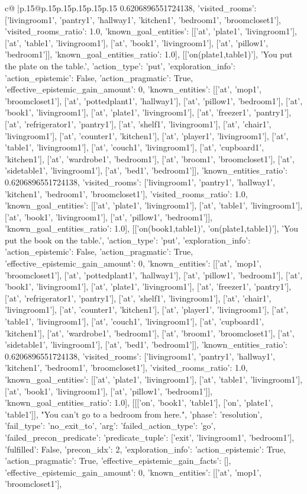 \documentclass{article}
\begin{document}
{\begin{supertabular}{c@{$\;$}|p{.15\linewidth}@{}p{.15\linewidth}p{.15\linewidth}p{.15\linewidth}p{.15\linewidth}p{.15\linewidth}}
{{{0.6206896551724138, 'visited_rooms': ['livingroom1', 'pantry1', 'hallway1', 'kitchen1', 'bedroom1', 'broomcloset1'], 'visited_rooms_ratio': 1.0, 'known_goal_entities': [['at', 'plate1', 'livingroom1'], ['at', 'table1', 'livingroom1'], ['at', 'book1', 'livingroom1'], ['at', 'pillow1', 'bedroom1']], 'known_goal_entities_ratio': 1.0}}], [['on(plate1,table1)'], 'You put the plate on the table.', {'action_type': 'put', 'exploration_info': {'action_epistemic': False, 'action_pragmatic': True, 'effective_epistemic_gain_amount': 0, 'known_entities': [['at', 'mop1', 'broomcloset1'], ['at', 'pottedplant1', 'hallway1'], ['at', 'pillow1', 'bedroom1'], ['at', 'book1', 'livingroom1'], ['at', 'plate1', 'livingroom1'], ['at', 'freezer1', 'pantry1'], ['at', 'refrigerator1', 'pantry1'], ['at', 'shelf1', 'livingroom1'], ['at', 'chair1', 'livingroom1'], ['at', 'counter1', 'kitchen1'], ['at', 'player1', 'livingroom1'], ['at', 'table1', 'livingroom1'], ['at', 'couch1', 'livingroom1'], ['at', 'cupboard1', 'kitchen1'], ['at', 'wardrobe1', 'bedroom1'], ['at', 'broom1', 'broomcloset1'], ['at', 'sidetable1', 'livingroom1'], ['at', 'bed1', 'bedroom1']], 'known_entities_ratio': 0.6206896551724138, 'visited_rooms': ['livingroom1', 'pantry1', 'hallway1', 'kitchen1', 'bedroom1', 'broomcloset1'], 'visited_rooms_ratio': 1.0, 'known_goal_entities': [['at', 'plate1', 'livingroom1'], ['at', 'table1', 'livingroom1'], ['at', 'book1', 'livingroom1'], ['at', 'pillow1', 'bedroom1']], 'known_goal_entities_ratio': 1.0}}], [['on(book1,table1)', 'on(plate1,table1)'], 'You put the book on the table.', {'action_type': 'put', 'exploration_info': {'action_epistemic': False, 'action_pragmatic': True, 'effective_epistemic_gain_amount': 0, 'known_entities': [['at', 'mop1', 'broomcloset1'], ['at', 'pottedplant1', 'hallway1'], ['at', 'pillow1', 'bedroom1'], ['at', 'book1', 'livingroom1'], ['at', 'plate1', 'livingroom1'], ['at', 'freezer1', 'pantry1'], ['at', 'refrigerator1', 'pantry1'], ['at', 'shelf1', 'livingroom1'], ['at', 'chair1', 'livingroom1'], ['at', 'counter1', 'kitchen1'], ['at', 'player1', 'livingroom1'], ['at', 'table1', 'livingroom1'], ['at', 'couch1', 'livingroom1'], ['at', 'cupboard1', 'kitchen1'], ['at', 'wardrobe1', 'bedroom1'], ['at', 'broom1', 'broomcloset1'], ['at', 'sidetable1', 'livingroom1'], ['at', 'bed1', 'bedroom1']], 'known_entities_ratio': 0.6206896551724138, 'visited_rooms': ['livingroom1', 'pantry1', 'hallway1', 'kitchen1', 'bedroom1', 'broomcloset1'], 'visited_rooms_ratio': 1.0, 'known_goal_entities': [['at', 'plate1', 'livingroom1'], ['at', 'table1', 'livingroom1'], ['at', 'book1', 'livingroom1'], ['at', 'pillow1', 'bedroom1']], 'known_goal_entities_ratio': 1.0}}], [[['on', 'book1', 'table1'], ['on', 'plate1', 'table1']], "You can't go to a bedroom from here.", {'phase': 'resolution', 'fail_type': 'no_exit_to', 'arg': {'failed_action_type': 'go', 'failed_precon_predicate': {'predicate_tuple': ['exit', 'livingroom1', 'bedroom1'], 'fulfilled': False, 'precon_idx': 2}}, 'exploration_info': {'action_epistemic': True, 'action_pragmatic': True, 'effective_epistemic_gain_facts': [], 'effective_epistemic_gain_amount': 0, 'known_entities': [['at', 'mop1', 'broomcloset1'], }}}
\end{supertabular}}
\end{document}
